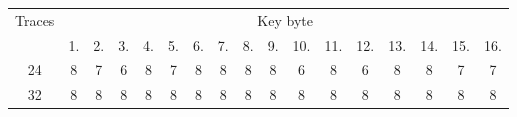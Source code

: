 \begin{tabular}{| c | c | c | c | c | c | c | c | c | c | c | c | c | c | c | c | c |}
	\hline
	\multirow{2}{*}{Traces} & \multicolumn{16}{c|}{Key byte} \\
	\cline{2-17}
	~  &  1. &  2. &  3. &  4. &  5. &  6. &  7. &  8.  &  9. & 10. & 11. & 12. & 13. & 14. & 15. & 16. \\
	\hline
	\hline
	24 & 8 & 7 & 6 & 8 & 7 & 8 & 8 & 8 & 8 & 6 & 8 & 6 & 8 & 8 & 7 & 7 \\
	\hline
	32 & 8 & 8 & 8 & 8 & 8 & 8 & 8 & 8 & 8 & 8 & 8 & 8 & 8 & 8 & 8 & 8 \\
	\hline
\end{tabular}
